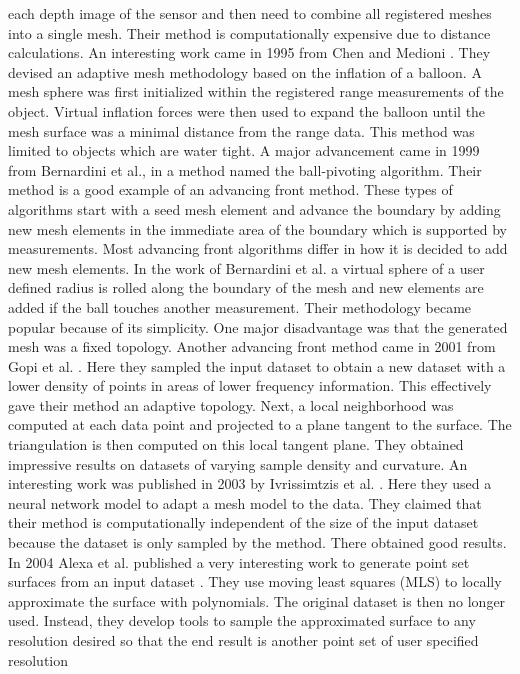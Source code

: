\documentclass[12pt]{article}
\begin{document}
each depth image of the sensor and then need to combine all registered
meshes into a single mesh. Their method is computationally expensive due to
distance calculations. An interesting work came in 1995 from Chen and
Medioni \cite{Chen1995}. They devised an adaptive mesh methodology based
on the inflation of a balloon. A mesh sphere was first initialized within
the registered range measurements of the object. Virtual inflation forces
were then used to expand the balloon until the mesh surface was a minimal
distance from the range data. This method was limited to objects which are
water tight. A major advancement came in 1999 from Bernardini et al.,
\cite{Bernardini1999a} in a method named the ball-pivoting algorithm. Their
method is a good example of an advancing front method. These types of
algorithms start with a seed mesh element and advance the boundary by
adding new mesh elements in the immediate area of the boundary which is
supported by measurements. Most advancing front algorithms differ in how it
is decided to add new mesh elements. In the work of Bernardini et al. a
virtual sphere of a user defined radius is rolled along the boundary of the
mesh and new elements are added if the ball touches another measurement.
Their methodology became popular because of its simplicity. One major
disadvantage was that the generated mesh was a fixed topology. Another
advancing front method came in 2001 from Gopi et al.
\cite{Gopi2001,Gopi2002}. Here they sampled the input dataset to obtain a new
dataset with a lower density of points in areas of lower frequency
information. This effectively gave their method an adaptive topology. Next,
a local neighborhood was computed at each data point and projected to a
plane tangent to the surface. The triangulation is then computed on this
local tangent plane. They obtained impressive results on datasets of
varying sample density and curvature. An interesting work was published in
2003 by Ivrissimtzis et al. \cite{Ivrissimtzis2003}. Here they used a
neural network model to adapt a mesh model to the data. They claimed that
their method is computationally independent of the size of the input
dataset because the dataset is only sampled by the method. There obtained
good results. In 2004 Alexa et al. published a very interesting
work to generate point set surfaces from an input dataset \cite{Alexa2004}.
They use moving least squares (MLS) to locally approximate the surface with
polynomials. The original dataset is then no longer used. Instead, they
develop tools to sample the approximated surface to any resolution desired
so that the end result is another point set of user specified resolution
\end{document}
